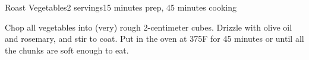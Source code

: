 \documentclass[../Cookbook.tex]{subfiles}
\begin{document}
\begin{recipe}{Roast Vegetables}{2 servings}{15 minutes prep, 45 minutes cooking}

Chop all vegetables into (very) rough 2-centimeter cubes. Drizzle with olive oil and rosemary, and stir to coat. Put in the oven at 375\0F for 45 minutes or until all the chunks are soft enough to eat.

\end{recipe}
\end{document}
